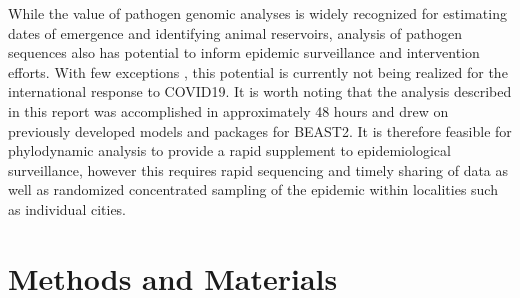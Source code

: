 \documentclass[9pt,lineno,onehalfspacing]{elife}
\begin{document}
While the value of pathogen genomic analyses is widely recognized for estimating dates of emergence\citep{Verity_Hill2020-uf,Gire2014-ql} and identifying animal reservoirs\citep{Zhou2020-pi,Dudas2018-ht}, analysis of pathogen sequences also has potential to inform epidemic surveillance and intervention efforts. 
With few exceptions \citep{stadler_2020-yc,Bedford2020-zl}, this potential is currently not being realized for the international response to COVID19. 
It is worth noting that the analysis described in this report was accomplished in approximately 48 hours and drew on previously developed models and packages for BEAST2\citep{bouckaert2019beast,Volz2018-mm}. 
It is therefore feasible for phylodynamic analysis to provide a rapid supplement to epidemiological surveillance, however this requires rapid sequencing and timely sharing of data as well as randomized concentrated sampling of the epidemic within localities such as individual cities. 

\section{Methods and Materials} 
\end{document}
